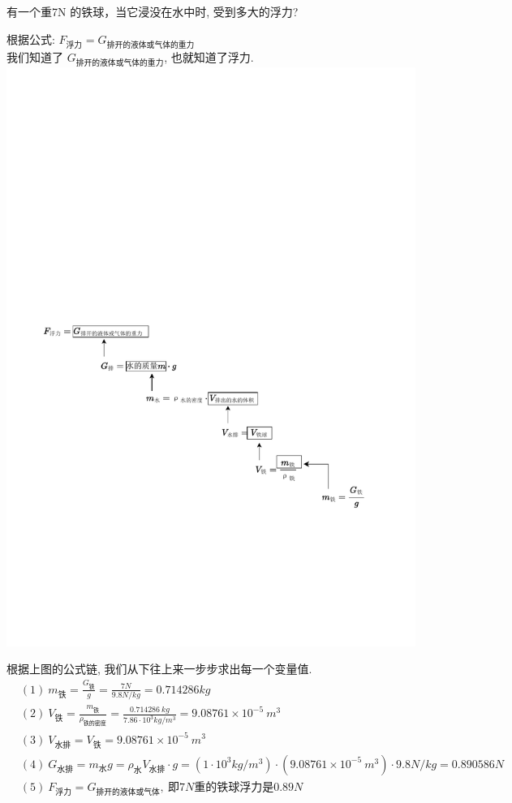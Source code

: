 \documentclass[UTF8]{ctexart}
\begin{document}
\begin{tcolorbox}[title = {例},boxrule={0.1em},colframe={black!10}, colback={black!3},colbacktitle={black!10},coltitle={black}]
有一个重7N 的铁球，当它浸没在水中时, 受到多大的浮力? 

根据公式: $F_{\text{浮力}}=G_{\text{排开的液体或气体的重力}}$ \\
我们知道了 $G_{\text{排开的液体或气体的重力}}$, 也就知道了浮力. \\

\includegraphics[width=1\textwidth]{img/0043.pdf}

根据上图的公式链, 我们从下往上来一步步求出每一个变量值. 
\begin{align*}
		& (1)\ m_{\text{铁}}=\frac{G_{\text{铁}}}{g}=\frac{7N}{9.8N/kg}=0.714286kg\\
	& (2)\ V_{\text{铁}}=\frac{m_{\text{铁}}}{\rho _{\text{铁的密度}}}=\frac{0.714286\ kg}{7.86\cdot 10^3kg/m^3}=9.08761\times 10^{-5}\ m^3\\
	& \left( 3 \right) \ V_{\text{水排}}=V_{\text{铁}}=9.08761\times 10^{-5}\ m^3\\
	& (4)\ G_{\text{水排}}=m_{\text{水}}g=\rho _{\text{水}}V_{\text{水排}}\cdot g=\left( 1\cdot 10^3kg/m^3 \right) \cdot \left( 9.08761\times 10^{-5}\ m^3 \right) \cdot 9.8N/kg=0.890586N\\
	& \left( 5 \right) \ F_{\text{浮力}}=G_{\text{排开的液体或气体}},\ \text{即}7N\text{重的铁球浮力是}0.89N\\	
\end{align*}

\end{tcolorbox}
\end{document}
